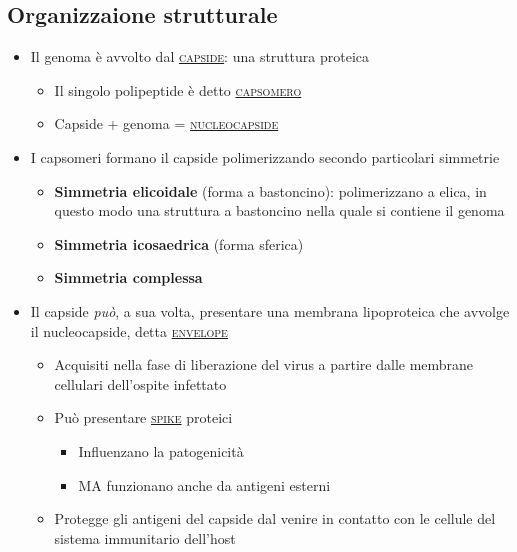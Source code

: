 \documentclass[italian,]{article}
\providecommand{\tightlist}{%
  \setlength{\itemsep}{0pt}\setlength{\parskip}{0pt}}
\renewcommand{\a}[1]{\underline{\textsc{#1}}}
\begin{document}
\hypertarget{organizzaione-strutturale}{%
\subsection{Organizzaione strutturale}\label{organizzaione-strutturale}}

\begin{itemize}
\tightlist
\item
  Il genoma è avvolto dal \a{capside}: una struttura proteica

  \begin{itemize}
  \tightlist
  \item
    Il singolo polipeptide è detto \a{capsomero}
  \item
    Capside + genoma = \a{nucleocapside}
  \end{itemize}
\item
  I capsomeri formano il capside polimerizzando secondo particolari
  simmetrie

  \begin{itemize}
  \tightlist
  \item
    \textbf{Simmetria elicoidale} (forma a bastoncino): polimerizzano a
    elica, in questo modo una struttura a bastoncino nella quale si
    contiene il genoma
  \item
    \textbf{Simmetria icosaedrica} (forma sferica)
  \item
    \textbf{Simmetria complessa}
  \end{itemize}
\item
  Il capside \emph{può}, a sua volta, presentare una membrana
  lipoproteica che avvolge il nucleocapside, detta \a{envelope}

  \begin{itemize}
  \tightlist
  \item
    Acquisiti nella fase di liberazione del virus a partire dalle
    membrane cellulari dell'ospite infettato
  \item
    Può presentare \a{spike} proteici

    \begin{itemize}
    \tightlist
    \item
      Influenzano la patogenicità
    \item
      MA funzionano anche da antigeni esterni
    \end{itemize}
  \item
    Protegge gli antigeni del capside dal venire in contatto con le
    cellule del sistema immunitario dell'host
  \end{itemize}
\end{itemize}
\end{document}
